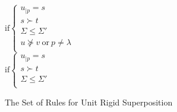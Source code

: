 \begin{figure}[htb]
\begin{center}
{%
\doubleLine{}
\UIC{$\top$}
\DP}\\[12pt]



\doubleLine{}
\DP\\[12pt]

\doubleLine{}
\DP\\[12pt]

\doubleLine{}
\DP
$\text{if} \left\{\begin{array}{l}
u_{|p} = s\\
s \succ t\\
\Sigma \leq \Sigma'\\
u \not\succeq v ~ \text{or} ~ p \neq \lambda\\
\end{array}\right.$\\[12pt]

\doubleLine{}
\DP
$\text{if} \left\{\begin{array}{l}
u_{|p} = s\\
s \succ t\\
\Sigma \leq \Sigma'\\
\end{array}\right.$
\caption{The Set of Rules for Unit Rigid Superposition}
\label{fig:unit-sup-rules}
\end{center}
\end{figure}

